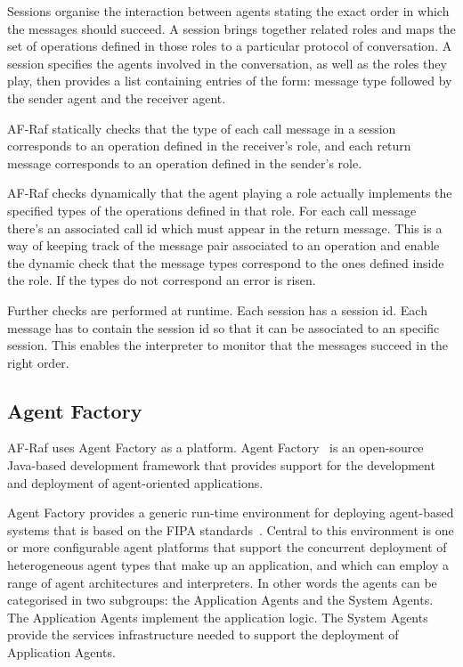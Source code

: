 \documentclass[a4paper,12pt,oneside,fleqn]{book} %
\begin{document}
Sessions organise the interaction between agents stating the exact order in
which the messages should succeed. A session brings together related roles
and maps the set of operations defined in those roles to a particular
protocol of conversation. A session specifies the agents involved in the
conversation, as well as the roles they play, then provides a list
containing entries of the form: message type followed by the sender agent
and the receiver agent.

AF-Raf statically checks that the type of each call message in a session
corresponds to an operation defined in the receiver's role, and each return
message corresponds to an operation defined in the sender's role.

AF-Raf checks dynamically that the agent playing a role actually implements
the specified types of the operations defined in that role.  For each call
message there's an associated call id which must appear in the return
message. This is a way of keeping track of the message pair associated to
an operation and enable the dynamic check that the message types correspond
to the ones defined inside the role. If the types do not correspond an
error is risen.

Further checks are performed at runtime. Each session has a session id.
Each message has to contain the session id so that it can be associated to
an specific session. This enables the interpreter to monitor that the
messages succeed in the right order.




\subsection{Agent Factory} %

AF-Raf uses Agent Factory as a platform. Agent
Factory~\cite{collier2002agent} is an open-source Java-based development
framework that provides support for the development and deployment of
agent-oriented applications.

Agent Factory provides a generic run-time environment for deploying
agent-based systems that is based on the FIPA
standards~\cite{poslad2000fipa}.  Central to this environment is one or
more configurable agent platforms that support the concurrent deployment of
heterogeneous agent types that make up an application, and which can employ
a range of agent architectures and interpreters. In other words the agents
can be categorised in two subgroups: the Application Agents and the System
Agents. The Application Agents implement the application logic. The System
Agents provide the services infrastructure needed to support the deployment
of Application Agents.
\end{document}
